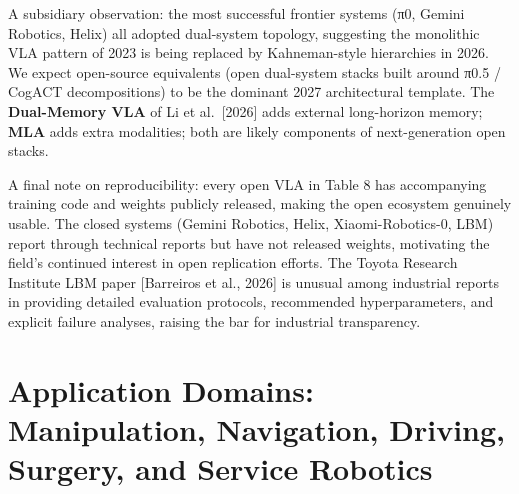 A subsidiary observation: the most successful frontier systems (π0, Gemini Robotics, Helix) all adopted dual-system topology, suggesting the monolithic VLA pattern of 2023 is being replaced by Kahneman-style hierarchies in 2026. We expect open-source equivalents (open dual-system stacks built around π0.5 / CogACT decompositions) to be the dominant 2027 architectural template. The \textbf{Dual-Memory VLA} of Li et al.~{[}2026{]} adds external long-horizon memory; \textbf{MLA} adds extra modalities; both are likely components of next-generation open stacks.

A final note on reproducibility: every open VLA in Table 8 has accompanying training code and weights publicly released, making the open ecosystem genuinely usable. The closed systems (Gemini Robotics, Helix, Xiaomi-Robotics-0, LBM) report through technical reports but have not released weights, motivating the field's continued interest in open replication efforts. The Toyota Research Institute LBM paper {[}Barreiros et al., 2026{]} is unusual among industrial reports in providing detailed evaluation protocols, recommended hyperparameters, and explicit failure analyses, raising the bar for industrial transparency.

\section{Application Domains: Manipulation, Navigation, Driving, Surgery, and Service Robotics}\label{application-domains-manipulation-navigation-driving-surgery-and-service-robotics}

